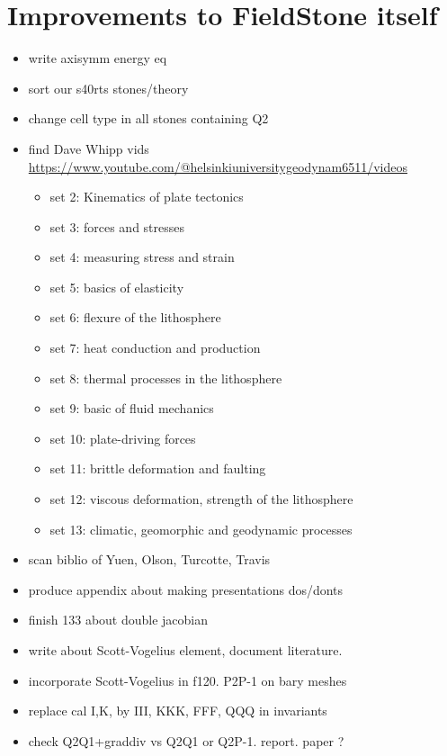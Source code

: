 \documentclass[a4paper]{article}
\begin{document}
\tableofcontents

\newpage
\section{Improvements to FieldStone itself}

\begin{itemize}
\item write axisymm energy eq 
\item sort our s40rts stones/theory
\item change cell type in all stones containing Q2
\item find Dave Whipp vids \url{https://www.youtube.com/@helsinkiuniversitygeodynam6511/videos}
\begin{itemize}
\item set 2: Kinematics of plate tectonics
\item set 3: forces and stresses
\item set 4: measuring stress and strain 
\item set 5: basics of elasticity
\item set 6: flexure of the lithosphere
\item set 7: heat conduction and production
\item set 8: thermal processes in the lithosphere
\item set 9: basic of fluid mechanics
\item set 10: plate-driving forces
\item set 11: brittle deformation and faulting
\item set 12: viscous deformation, strength of the lithosphere
\item set 13: climatic, geomorphic and geodynamic processes
\end{itemize}
\item scan biblio of Yuen, Olson, Turcotte, Travis
\item produce appendix about making presentations dos/donts 
\item finish 133 about double jacobian
\item write about Scott-Vogelius element, document literature. 
\item incorporate Scott-Vogelius in f120. P2P-1 on bary meshes
\item replace cal I,K, by III, KKK, FFF, QQQ in invariants 
\item check Q2Q1+graddiv vs Q2Q1 or Q2P-1. report. paper ?
\end{itemize}
\end{document}
